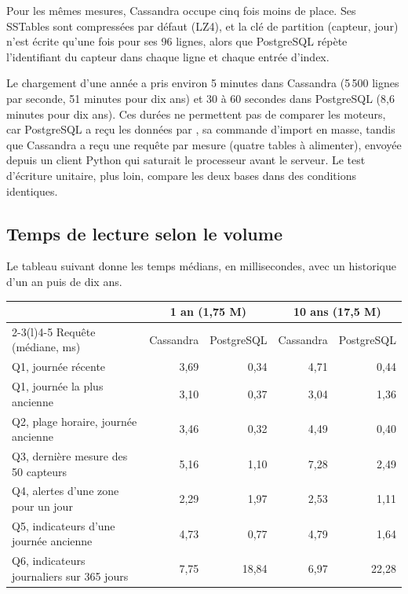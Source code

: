 \documentclass[11pt,a4paper]{article}
\newcommand{\cq}[1]{\texttt{\detokenize{#1}}}
\begin{document}
Pour les mêmes mesures, Cassandra occupe cinq fois moins de place. Ses SSTables sont compressées par défaut (LZ4), et la clé de partition (capteur, jour) n'est écrite qu'une fois pour ses 96 lignes, alors que PostgreSQL répète l'identifiant du capteur dans chaque ligne et chaque entrée d'index.

Le chargement d'une année a pris environ 5 minutes dans Cassandra (5\,500 lignes par seconde, 51 minutes pour dix ans) et 30 à 60 secondes dans PostgreSQL (8,6 minutes pour dix ans). Ces durées ne permettent pas de comparer les moteurs, car PostgreSQL a reçu les données par \cq{COPY}, sa commande d'import en masse, tandis que Cassandra a reçu une requête \cq{INSERT} par mesure (quatre tables à alimenter), envoyée depuis un client Python qui saturait le processeur avant le serveur. Le test d'écriture unitaire, plus loin, compare les deux bases dans des conditions identiques.

\subsection{Temps de lecture selon le volume}
Le tableau suivant donne les temps médians, en millisecondes, avec un historique d'un an puis de dix ans.

\begin{center}
\small
\begin{tabular}{@{}lrrrr@{}}
\toprule
 & \multicolumn{2}{c}{1 an (1,75 M)} & \multicolumn{2}{c}{10 ans (17,5 M)} \\
\cmidrule(lr){2-3}\cmidrule(l){4-5}
Requête (médiane, ms) & Cassandra & PostgreSQL & Cassandra & PostgreSQL \\
\midrule
Q1, journée récente & 3,69 & 0,34 & 4,71 & 0,44 \\
Q1, journée la plus ancienne & 3,10 & 0,37 & 3,04 & 1,36 \\
Q2, plage horaire, journée ancienne & 3,46 & 0,32 & 4,49 & 0,40 \\
Q3, dernière mesure des 50 capteurs & 5,16 & 1,10 & 7,28 & 2,49 \\
Q4, alertes d'une zone pour un jour & 2,29 & 1,97 & 2,53 & 1,11 \\
Q5, indicateurs d'une journée ancienne & 4,73 & 0,77 & 4,79 & 1,64 \\
Q6, indicateurs journaliers sur 365 jours & 7,75 & 18,84 & 6,97 & 22,28 \\
\bottomrule
\end{tabular}
\end{center}
\end{document}
